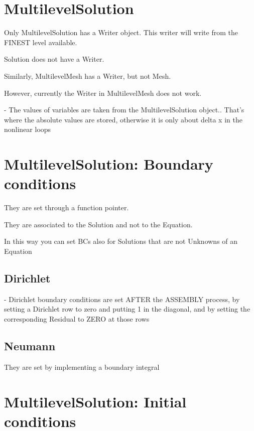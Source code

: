 \documentclass[10pt]{book}
\begin{document}
  \section{MultilevelSolution}
   
   Only MultilevelSolution has a Writer object. This writer will write from the FINEST level available.
   
   Solution does not have a Writer.
   
   Similarly, MultilevelMesh has a Writer, but not Mesh.
  
   However, currently the Writer in MultilevelMesh does not work.
   

   - The values of variables are taken from the MultilevelSolution object..
     That's where the absolute values are stored, otherwise it is only about delta x in the nonlinear loops

     
  \section{MultilevelSolution: Boundary conditions}

  
  They are set through a function pointer.
  
  They are associated to the Solution and not to the Equation.
  
  In this way you can set BCs also for Solutions that are not Unknowns of an Equation

   \subsection{Dirichlet}
  
  -  Dirichlet boundary conditions are set AFTER the ASSEMBLY process,
     by setting a Dirichlet row to zero and putting 1 in the diagonal,
     and by setting the corresponding Residual to ZERO at those rows
  
   \subsection{Neumann}
   
    They are set by implementing a boundary integral
    
    
    
  
  
  \section{MultilevelSolution: Initial conditions}
  
\end{document}

